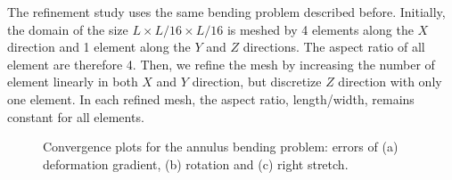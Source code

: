 \documentclass[12pt]{article}
\begin{document}
The refinement study uses the same bending problem described
before. Initially, the domain of the size $L \times L/16 \times L/16$
is meshed by 4 elements along the $X$ direction and 1 element along
the $Y$ and $Z$ directions. The aspect ratio of all element are
therefore 4. Then, we refine the mesh by increasing the number of
element linearly in both $X$ and $Y$ direction, but discretize $Z$
direction with only one element.  In each refined mesh, the aspect
ratio, length/width, remains constant for all elements.
\begin{figure}[htbp]
  \begin{center}
    \unitlength=1.0mm
    \caption{Convergence plots for the annulus bending problem: errors
      of (a) deformation gradient, (b) rotation and (c) right
      stretch.}
    \label{fig:RingRefinement}
  \end{center}
\end{figure}
\end{document}

